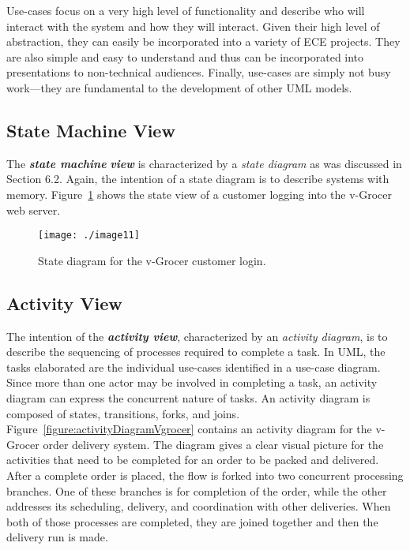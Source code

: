 Use-cases focus on a very high level of functionality and describe who
will interact with the system and how they will interact. Given their
high level of abstraction, they can easily be incorporated into a
variety of ECE projects. They are also simple and easy to understand and
thus can be incorporated into presentations to non-technical audiences.
Finally, use-cases are simply not busy work---they are fundamental to
the development of other UML models.

\subsection{State Machine View}
\label{subsection:state-machine-view}

The \emph{\textbf{state machine}} \emph{\textbf{view}} is characterized
by a \emph{state diagram} as was discussed in Section 6.2. Again, the
intention of a state diagram is to describe systems with memory. 
Figure~\ref{figure:stateDiagramVgrocer} shows the state 
view of a customer logging into the v-Grocer web
server.


\begin{figure}
\texttt{[image: ./image11]}
\caption{State diagram for the v-Grocer customer login.}
\label{figure:stateDiagramVgrocer}
\end{figure}

\subsection{Activity View}
\label{subsection:activity-view}

The intention of the \emph{\textbf{activity view}}, characterized by an
\emph{activity diagram}, is to describe the sequencing of processes
required to complete a task. In UML, the tasks elaborated are the
individual use-cases identified in a use-case diagram. Since more than
one actor may be involved in completing a task, an activity diagram can
express the concurrent nature of tasks. An activity diagram is composed
of states, transitions, forks, and joins. 
Figure~\ref{figure:activityDiagramVgrocer} contains an
activity diagram for the v-Grocer order delivery system. The diagram
gives a clear visual picture for the activities that need to be
completed for an order to be packed and delivered. After a complete
order is placed, the flow is forked into two concurrent processing
branches. One of these branches is for completion of the order, while
the other addresses its scheduling, delivery, and coordination with
other deliveries. When both of those processes are completed, they are
joined together and then the delivery run is made.


